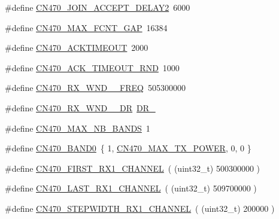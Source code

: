 \begin{DoxyCompactItemize}
\#define \hyperlink{group__REGIONCN470_gad695261614b3d750749b401fcd685e50}{C\+N470\+\_\+\+J\+O\+I\+N\+\_\+\+A\+C\+C\+E\+P\+T\+\_\+\+D\+E\+L\+A\+Y2}~6000
\item 
\#define \hyperlink{group__REGIONCN470_ga5737cff937bc40a5a512f783fd0e9365}{C\+N470\+\_\+\+M\+A\+X\+\_\+\+F\+C\+N\+T\+\_\+\+G\+AP}~16384
\item 
\#define \hyperlink{group__REGIONCN470_gac4bc7c6dea1ebeb1cfe0e9a0ecb0db72}{C\+N470\+\_\+\+A\+C\+K\+T\+I\+M\+E\+O\+UT}~2000
\item 
\#define \hyperlink{group__REGIONCN470_ga020ad82ebe368189c51b4d21a7b5596d}{C\+N470\+\_\+\+A\+C\+K\+\_\+\+T\+I\+M\+E\+O\+U\+T\+\_\+\+R\+ND}~1000
\item 
\#define \hyperlink{group__REGIONCN470_ga2e28269fe49bac86f3143397559e4db4}{C\+N470\+\_\+\+R\+X\+\_\+\+W\+N\+D\+\_\+\_\+\+F\+R\+EQ}~505300000
\item 
\#define \hyperlink{group__REGIONCN470_ga7aefeac71ff5edcd3a5628d12b84a25c}{C\+N470\+\_\+\+R\+X\+\_\+\+W\+N\+D\+\_\+\_\+\+DR}~\hyperlink{group__REGION_ga6c4ef966b4f3d5eb7597b087f2b97095}{D\+R\+\_}
\item 
\#define \hyperlink{group__REGIONCN470_ga46b33f1d67ef81deefa12018749a22ff}{C\+N470\+\_\+\+M\+A\+X\+\_\+\+N\+B\+\_\+\+B\+A\+N\+DS}~1
\item 
\#define \hyperlink{group__REGIONCN470_gaf6813f74ce73e4d0ab7971a89ab2ac2e}{C\+N470\+\_\+\+B\+A\+N\+D0}~\{ 1, \hyperlink{group__REGIONCN470_gae977eb62cc9b2f49770b5f0d5ec1e5df}{C\+N470\+\_\+\+M\+A\+X\+\_\+\+T\+X\+\_\+\+P\+O\+W\+ER}, 0,  0 \}
\item 
\#define \hyperlink{group__REGIONCN470_gaffb4e82c12bc61e97f83d18fb4187aa8}{C\+N470\+\_\+\+F\+I\+R\+S\+T\+\_\+\+R\+X1\+\_\+\+C\+H\+A\+N\+N\+EL}~( (uint32\+\_\+t) 500300000 )
\item 
\#define \hyperlink{group__REGIONCN470_ga5a6508f01066a5bde9c059367babd9cb}{C\+N470\+\_\+\+L\+A\+S\+T\+\_\+\+R\+X1\+\_\+\+C\+H\+A\+N\+N\+EL}~( (uint32\+\_\+t) 509700000 )
\item 
\#define \hyperlink{group__REGIONCN470_ga7786b9dddae0675b2d8cc26b0d230756}{C\+N470\+\_\+\+S\+T\+E\+P\+W\+I\+D\+T\+H\+\_\+\+R\+X1\+\_\+\+C\+H\+A\+N\+N\+EL}~( (uint32\+\_\+t) 200000 )
\end{DoxyCompactItemize}
